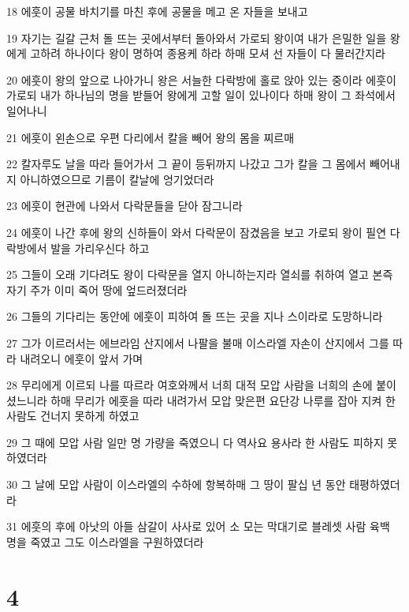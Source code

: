 \par 18 에훗이 공물 바치기를 마친 후에 공물을 메고 온 자들을 보내고
\par 19 자기는 길갈 근처 돌 뜨는 곳에서부터 돌아와서 가로되 왕이여 내가 은밀한 일을 왕에게 고하려 하나이다 왕이 명하여 종용케 하라 하매 모셔 선 자들이 다 물러간지라
\par 20 에훗이 왕의 앞으로 나아가니 왕은 서늘한 다락방에 홀로 앉아 있는 중이라 에훗이 가로되 내가 하나님의 명을 받들어 왕에게 고할 일이 있나이다 하매 왕이 그 좌석에서 일어나니
\par 21 에훗이 왼손으로 우편 다리에서 칼을 빼어 왕의 몸을 찌르매
\par 22 칼자루도 날을 따라 들어가서 그 끝이 등뒤까지 나갔고 그가 칼을 그 몸에서 빼어내지 아니하였으므로 기름이 칼날에 엉기었더라
\par 23 에훗이 현관에 나와서 다락문들을 닫아 잠그니라
\par 24 에훗이 나간 후에 왕의 신하들이 와서 다락문이 잠겼음을 보고 가로되 왕이 필연 다락방에서 발을 가리우신다 하고
\par 25 그들이 오래 기다려도 왕이 다락문을 열지 아니하는지라 열쇠를 취하여 열고 본즉 자기 주가 이미 죽어 땅에 엎드러졌더라
\par 26 그들의 기다리는 동안에 에훗이 피하여 돌 뜨는 곳을 지나 스이라로 도망하니라
\par 27 그가 이르러서는 에브라임 산지에서 나팔을 불매 이스라엘 자손이 산지에서 그를 따라 내려오니 에훗이 앞서 가며
\par 28 무리에게 이르되 나를 따르라 여호와께서 너희 대적 모압 사람을 너희의 손에 붙이셨느니라 하매 무리가 에훗을 따라 내려가서 모압 맞은편 요단강 나루를 잡아 지켜 한 사람도 건너지 못하게 하였고
\par 29 그 때에 모압 사람 일만 명 가량을 죽였으니 다 역사요 용사라 한 사람도 피하지 못하였더라
\par 30 그 날에 모압 사람이 이스라엘의 수하에 항복하매 그 땅이 팔십 년 동안 태평하였더라
\par 31 에훗의 후에 아낫의 아들 삼갈이 사사로 있어 소 모는 막대기로 블레셋 사람 육백 명을 죽였고 그도 이스라엘을 구원하였더라

\chapter{4}

